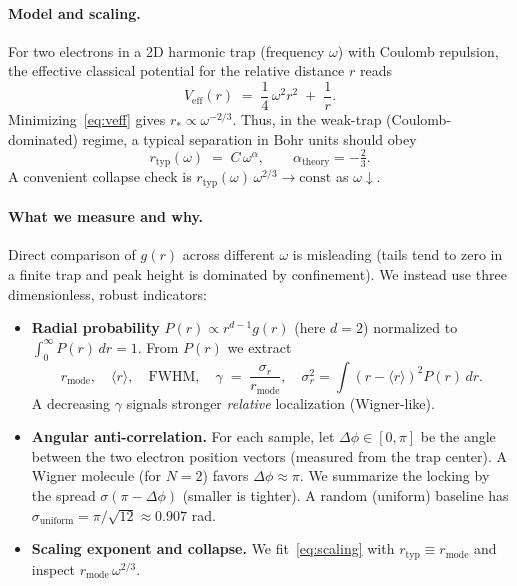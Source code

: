 \paragraph{Model and scaling.}
For two electrons in a 2D harmonic trap (frequency $\omega$) with Coulomb
repulsion, the effective classical potential for the relative distance $r$
reads
\begin{equation}
  V_{\text{eff}}(r) \;=\; \frac{1}{4}\,\omega^2 r^2 \;+\; \frac{1}{r}.
  \label{eq:veff}
\end{equation}
Minimizing~\eqref{eq:veff} gives $r_*\propto \omega^{-2/3}$. Thus, in the
weak-trap (Coulomb-dominated) regime, a typical separation in Bohr units should
obey
\begin{equation}
  r_{\text{typ}}(\omega) \;=\; C\,\omega^{\alpha},\qquad \alpha_{\text{theory}}=-\tfrac{2}{3}.
  \label{eq:scaling}
\end{equation}
A convenient collapse check is $r_{\text{typ}}(\omega)\,\omega^{2/3}\to\text{const}$ as
$\omega\!\downarrow$.

\paragraph{What we measure and why.}
Direct comparison of $g(r)$ across different $\omega$ is misleading (tails tend
to zero in a finite trap and peak height is dominated by confinement). We
instead use three dimensionless, robust indicators:
\begin{itemize}
  \item \textbf{Radial probability} $P(r)\propto r^{d-1} g(r)$ (here $d{=}2$) normalized to
  $\int_0^\infty P(r)\,dr=1$. From $P(r)$ we extract
  \[
   r_{\text{mode}},\quad \langle r\rangle,\quad \text{FWHM},\quad
   \gamma \;=\; \frac{\sigma_r}{r_{\text{mode}}},\quad
   \sigma_r^2=\int (r-\langle r\rangle)^2 P(r)\,dr.
  \]
  A decreasing $\gamma$ signals stronger \emph{relative} localization (Wigner-like).
  \item \textbf{Angular anti-correlation.} For each sample, let $\Delta\phi\in[0,\pi]$
  be the angle between the two electron position vectors (measured from the trap center).
  A Wigner molecule (for $N{=}2$) favors $\Delta\phi\approx\pi$. We summarize the locking
  by the spread $\sigma(\pi-\Delta\phi)$ (smaller is tighter). A random (uniform) baseline
  has $\sigma_{\text{uniform}}=\pi/\sqrt{12}\approx 0.907$ rad.
  \item \textbf{Scaling exponent and collapse.} We fit~\eqref{eq:scaling} with
  $r_{\text{typ}}\equiv r_{\text{mode}}$ and inspect $r_{\text{mode}}\,\omega^{2/3}$.
\end{itemize}

